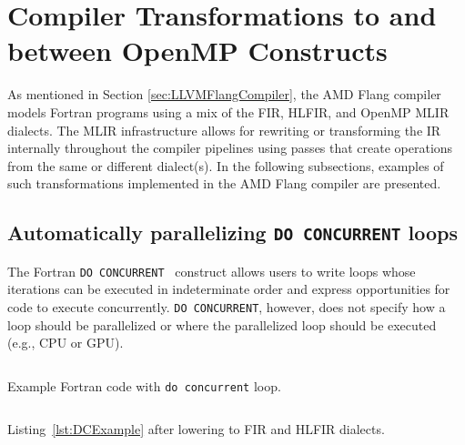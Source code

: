 \documentclass[acmtog,natbib=false]{acmart}
\newcommand{\code}[1]{\texttt{#1}\xspace}
\begin{document}
\section{Compiler Transformations to and between OpenMP Constructs}
\label{sec:CompilerTransOpenMP}

As mentioned in Section \ref{sec:LLVMFlangCompiler}, the AMD Flang compiler models Fortran programs using a mix of the \ac{FIR}, \ac{HLFIR}, and OpenMP \ac{MLIR} dialects.
The \ac{MLIR} infrastructure allows for rewriting or transforming the \ac{IR} internally throughout the compiler pipelines using passes that create operations from the same or different dialect(s).
In the following subsections, examples of such transformations implemented in the AMD Flang compiler are presented.

\subsection{Automatically parallelizing \code{DO CONCURRENT} loops}
\label{sec:DCPar}

The Fortran \code{DO CONCURRENT}~\cite{F2023} construct allows users to write loops whose iterations can be executed in indeterminate order and express opportunities for code to execute concurrently.
\code{DO CONCURRENT}, however, does not specify how a loop should be parallelized or where the parallelized loop should be executed (e.g., CPU or GPU).

\begin{listing}[t]
\inputminted{Fortran}{code/dc_saxpy.f90}
\caption{Example Fortran code with \code{do concurrent} loop.}
\label{lst:DCExample}
\end{listing}

\begin{listing}[t]
\inputminted{MLIR-lexer.py:MlirLexer -x}{code/dc_fir.mlir}
\caption{Listing~\ref{lst:DCExample} after lowering to \acs{FIR} and \acs{HLFIR} dialects.}
\label{lst:DCFIRExample}
\end{listing}
\end{document}
